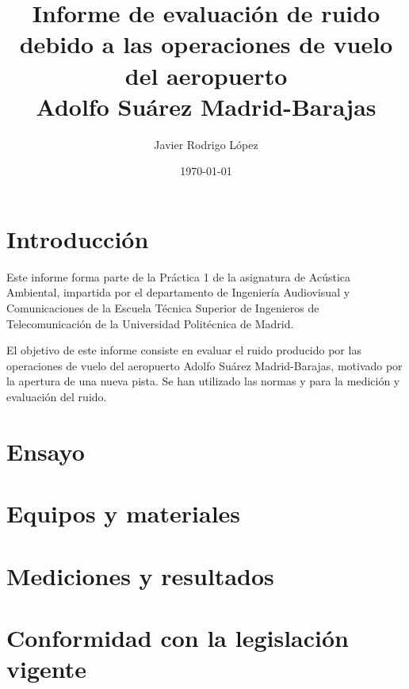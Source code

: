 \documentclass[11pt]{article}
\begin{document}
\title{\textbf{Informe de evaluación de ruido debido a las operaciones de vuelo del aeropuerto\\Adolfo Suárez Madrid-Barajas}}
\author{Javier Rodrigo López}
\date{\today}
\maketitle


{
}

\thispagestyle{firststyle}


\fancyhead{}
\pagestyle{fancy}

\pagestyle{fancy}

\setcounter{figure}{0}
\setlength{\parskip}{0.5em}

\hypersetup{
    citecolor=black,
    filecolor=black,
    linkcolor=black,
    urlcolor=blueX
}

\tableofcontents
\listoffigures


\newpage

\setcounter{page}{2}

\section{Introducción}

Este informe forma parte de la Práctica 1 de la asignatura de Acústica Ambiental, impartida por el departamento de Ingeniería Audiovisual y Comunicaciones de la Escuela Técnica Superior de Ingenieros de Telecomunicación de la Universidad Politécnica de Madrid.

El objetivo de este informe consiste en evaluar el ruido producido por las operaciones de vuelo del aeropuerto Adolfo Suárez Madrid-Barajas, motivado por la apertura de una nueva pista. Se han utilizado las normas \cite{ISO1996-2:2020} y \cite{ISO20906:2009} para la medición y evaluación del ruido.

\section{Ensayo}
\section{Equipos y materiales}
\section{Mediciones y resultados}
\section{Conformidad con la legislación vigente}


\nocite{*}
\newpage


\end{document}
